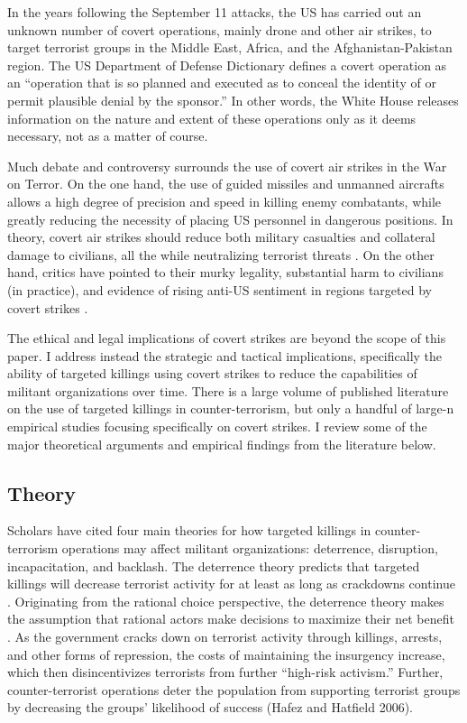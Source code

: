 \documentclass[letterpaper,12pt]{article}
\theoremstyle{definition}
\begin{document}
In the years following the September 11 attacks, the US has carried out an unknown number of covert operations, mainly drone and other air strikes, to target terrorist groups in the Middle East, Africa, and the Afghanistan-Pakistan region. The US Department of Defense Dictionary defines a covert operation as an ``operation that is so planned and executed as to conceal the identity of or permit plausible denial by the sponsor.'' In other words, the White House releases information on the nature and extent of these operations only as it deems necessary, not as a matter of course.

Much debate and controversy surrounds the use of covert air strikes in the War on Terror. On the one hand, the use of guided missiles and unmanned aircrafts allows a high degree of precision and speed in killing enemy combatants, while greatly reducing the necessity of placing US personnel in dangerous positions. In theory, covert air strikes should reduce both military casualties and collateral damage to civilians, all the while neutralizing terrorist threats \cite{etzioni}. On the other hand, critics have pointed to their murky legality, substantial harm to civilians (in practice), and evidence of rising anti-US sentiment in regions targeted by covert strikes \cite{terrorfree,cavallaro,pew,khan}. 

The ethical and legal implications of covert strikes are beyond the scope of this paper. I address instead the strategic and tactical implications, specifically the ability of targeted killings using covert strikes to reduce the capabilities of militant organizations over time. There is a large volume of published literature on the use of targeted killings in counter-terrorism, but only a handful of large-n empirical studies focusing specifically on covert strikes. I review some of the major theoretical arguments and empirical findings from the literature below.

\subsection{Theory}

Scholars have cited four main theories for how targeted killings in counter-terrorism operations may affect militant organizations: deterrence, disruption, incapacitation, and backlash. The deterrence theory predicts that targeted killings will decrease terrorist activity for at least as long as crackdowns continue \cite{hafezhatfield,johnstonsarbahi}. Originating from the rational choice perspective, the deterrence theory makes the assumption that rational actors make decisions to maximize their net benefit \cite{lafree}. As the government cracks down on terrorist activity through killings, arrests, and other forms of repression, the costs of maintaining the insurgency increase, which then disincentivizes terrorists from further ``high-risk activism.'' Further, counter-terrorist operations deter the population from supporting terrorist groups by decreasing the groups' likelihood of success (Hafez and Hatfield 2006).
\end{document}
